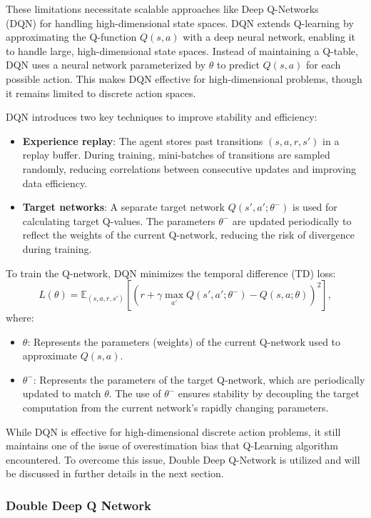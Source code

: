 \documentclass{article}
\begin{document}
These limitations necessitate scalable approaches like Deep Q-Networks\\(DQN) for handling high-dimensional state spaces. 
DQN extends Q-learning by approximating the Q-function \(Q(s, a)\) with a deep neural network, enabling it to handle large, high-dimensional state spaces. 
Instead of maintaining a Q-table, DQN uses a neural network parameterized by \(\theta\) to predict \(Q(s, a)\) for each possible action. This makes DQN effective for high-dimensional problems, though it remains limited to discrete action spaces.

DQN introduces two key techniques to improve stability and efficiency:
\begin{itemize}
    \item \textbf{Experience replay}: The agent stores past transitions \((s, a, r, s')\) in a replay buffer. During training, mini-batches of transitions are sampled randomly, reducing correlations between consecutive updates and improving data efficiency.
    \item \textbf{Target networks}: A separate target network \(Q(s', a'; \theta^-)\) is used for calculating target Q-values. The parameters \(\theta^-\) are updated periodically to reflect the weights of the current Q-network, reducing the risk of divergence during training.
\end{itemize}

To train the Q-network, DQN minimizes the temporal difference (TD) loss:
\[
L(\theta) = \mathbb{E}_{(s, a, r, s')} \left[ \left( r + \gamma \max_{a'} Q(s', a'; \theta^-) - Q(s, a; \theta) \right)^2 \right],
\]
where:
\begin{itemize}
    \item \(\theta\): Represents the parameters (weights) of the current Q-network used to approximate \(Q(s, a)\).
    \item \(\theta^-\): Represents the parameters of the target Q-network, which are periodically updated to match \(\theta\). The use of \(\theta^-\) ensures stability by decoupling the target computation from the current network’s rapidly changing parameters.
\end{itemize}

While DQN is effective for high-dimensional discrete action problems, it still
maintains one of the issue of overestimation bias that Q-Learning algorithm
encountered. To overcome this issue, Double Deep Q-Network is utilized and will
be discussed in further details in the next section.
\subsubsection{Double Deep Q Network}
\end{document}
